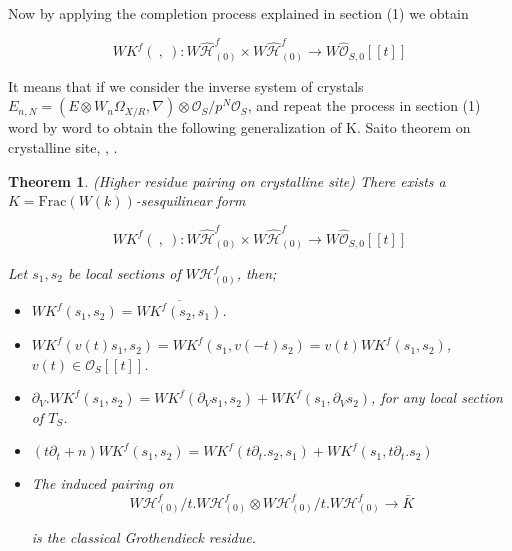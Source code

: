 \documentclass[12pt,twoside]{amsart}
\newtheorem{theorem}{Theorem}[section]
\begin{document}
\vspace{0.5cm}

\noindent
Now by applying the completion process explained in section (1) we obtain 

\[ WK^f( \ , \ ):W\widehat{\mathcal{H}}_{(0)}^f \times W\widehat{\mathcal{H}}_{(0)}^f \to W\widehat{\mathcal{O}}_{S,0}[[t]] \]

\vspace{0.5cm}

\noindent
It means that if we consider the inverse system of crystals $E_{n,N}=(E \otimes W_n \Omega_{X/R}, \nabla ) \otimes \mathcal{O}_S/p^N\mathcal{O}_S$, and repeat the process in section (1) word by word to obtain the following generalization of K. Saito theorem on crystalline site, \cite{LLS}, \cite{SA1}. 

\vspace{0.5cm}

\begin{theorem}(Higher residue pairing on crystalline site) There exists a $K=\text{Frac}(W(k))$-sesquilinear form 

\[ WK^f( \ , \ ):W\widehat{\mathcal{H}}_{(0)}^f \times W\widehat{\mathcal{H}}_{(0)}^f \to W\widehat{\mathcal{O}}_{S,0}[[t]] \]

\vspace{0.5cm}

\noindent
Let $s_1,s_2$ be local sections of $W\mathcal{H}_{(0)}^f$, then;

\vspace{0.5cm}

\begin{itemize}
\item $WK^f(s_1,s_2)=\overline{WK^f(s_2,s_1)}$.

\vspace{0.2cm}

\item $WK^f(v(t)s_1,s_2)=WK^f(s_1,v(-t)s_2)=v(t)WK^f(s_1,s_2)$, $v(t) \in \mathcal{O}_S[[t]]$.

\vspace{0.2cm}

\item $\partial_V.WK^f(s_1,s_2)=WK^f(\partial_Vs_1,s_2)+WK^f(s_1,\partial_Vs_2)$, for any local section of $T_S$.

\vspace{0.2cm}

\item $(t\partial_t+n)WK^f(s_1,s_2)=WK^f(t\partial_t.s_2,s_1)+WK^f(s_1,t \partial_t.s_2)$

\vspace{0.2cm}

\item The induced pairing on 
\[ W\mathcal{H}_{(0)}^f/t.W\mathcal{H}_{(0)}^f \otimes W\mathcal{H}_{(0)}^f/t.W\mathcal{H}_{(0)}^f \to \bar{K} \]

\vspace{0.3cm}

\noindent
is the classical Grothendieck residue.

\end{itemize}
\end{theorem}
\end{document}
